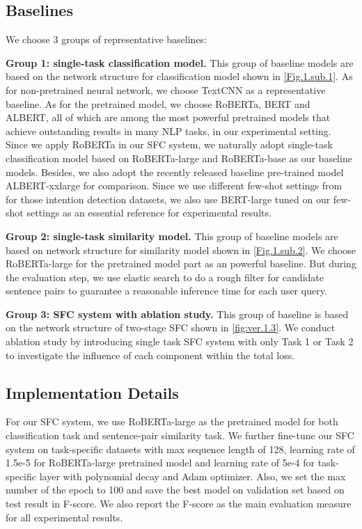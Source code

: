 \documentclass[letterpaper]{article} %
\begin{document}
  \subsection{Baselines}
  We choose 3 groups of representative baselines:

  \textbf{Group  1:  single-task  classification  model.} This group of baseline
  models  are  based  on the network structure for classification model shown in
  \ref{Fig.1.sub.1}.   As   for   non-pretrained   neural   network,  we  choose
  TextCNN \cite{kim2014convolutional}  as  a  representative baseline. As for the
  pretrained  model,  we choose RoBERTa, BERT and ALBERT, all of which are among
  the  most  powerful pretrained models that achieve outstanding results in many
  NLP  tasks,  in  our  experimental  setting. Since we apply RoBERTa in our SFC
  system,   we   naturally  adopt  single-task  classification  model  based  on
  RoBERTa-large  and RoBERTa-base as our baseline models. Besides, we also adopt
  the       recently       released       baseline       pre-trained       model
  ALBERT-xxlarge \cite{lan2019albert}  for  comparison.  Since  we  use different
  few-shot   settings   from    \cite{casanueva2020efficient}  for  those
  intention
  detection  datasets,  we also use BERT-large tuned on our few-shot settings as
  an essential reference for experimental results.


  \textbf{Group  2: single-task similarity model.} This group of baseline models
  are   based   on   network   structure   for   similarity   model   shown   in
  \ref{Fig.1.sub.2}. We choose RoBERTa-large for the pretrained model part as an
  powerful baseline. But during the evaluation step, we use elastic search to do
  a  rough  filter  for  candidate  sentence  pairs  to  guarantee  a reasonable
  inference time for each user query.

  \textbf{Group  3:  SFC  system with ablation study.} This group of baseline is
  based  on  the network structure of two-stage SFC shown in \ref{fig:ver.1.3}. We
  conduct  ablation study by introducing single task SFC system with only Task 1
  or  Task  2  to  investigate  the influence of each component within the total
  loss.

  \subsection{Implementation Details}
  For  our  SFC  system,  we  use RoBERTa-large as the pretrained model for both
  classification  task  and  sentence-pair similarity task. We further fine-tune
  our  SFC  system  on  task-specific  datasets with max sequence length of 128,
  learning  rate  of 1.5e-5 for RoBERTa-large pretrained model and learning rate
  of  5e-4  for  task-specific  layer  with polynomial decay and Adam optimizer.
  Also,  we  set  the  max number of the epoch to 100 and save the best model on
  validation  set based on test result in F-score. We also report the F-score as
  the main evaluation measure for all experimental results.
\end{document}
